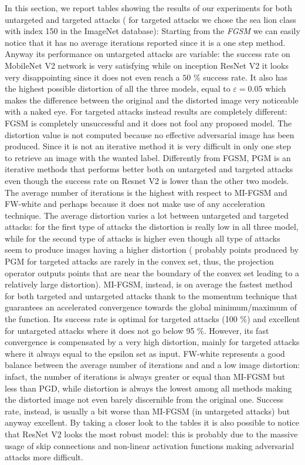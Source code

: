 \documentclass[10pt,twocolumn,letterpaper, english]{article}
\theoremstyle{definition}
\theoremstyle{plain}
\theoremstyle{plain}
\theoremstyle{plain}
\theoremstyle{plain}
\theoremstyle{remark}
\theoremstyle{remark}
\theoremstyle{definition}
\theoremstyle{definition}
\theoremstyle{definition}
\theoremstyle{definition}
\renewcommand{\epsilon}{\varepsilon}
\begin{document}
In this section, we report tables showing the results of our experiments for both untargeted and targeted attacks ( for targeted attacks we chose the sea lion class with index 150 in the ImageNet database):
Starting from the \textit{FGSM} we can easily notice that it has no average iterations reported since it is a one step method. Anyway its performance on untargeted attacks are variable: the success rate on MobileNet V2 network is very satisfying while on inception ResNet V2 it looks very disappointing since it does not even reach a $50$ \% success rate.
It also has the highest possible distortion of all the three models, equal to $\epsilon = 0.05$ which makes the difference between the original and the distorted image very noticeable with a naked eye.
For targeted attacks instead results are completely different: FGSM is completely unsuccessful and it does not fool any proposed model. The distortion value is not computed because no effective adversarial image has been produced. Since it is not an iterative method it is very difficult in only one step to retrieve an image with the wanted label.
Differently from FGSM, PGM is an iterative methods that performs better both on untargeted and targeted attacks even though the success rate on Resnet V2 is lower than the other two models. The average number of iterations is the highest with respect to MI-FGSM and FW-white and perhaps because it does not make use of any acceleration technique. The average distortion varies a lot between untargeted and targeted attacks: for the first type of attacks the distortion is really low in all three model, while for the second type of attacks is higher even though all type of attacks seem to produce images having a higher distortion ( probably points produced by PGM for targeted attacks are rarely in the convex set, thus, the projection operator outputs points that are near the boundary of the convex set leading to a relatively large distortion).
MI-FGSM, instead, is on average the fastest method for both targeted and untargeted attacks thank to the momentum technique that guarantees an  accelerated convergence towards the global minimum/maximum of the function. Its success rate is optimal for targeted attacks (100 \%) and excellent for untargeted attacks where it does not go below 95 \%. However, its fast convergence is compensated by a very high distortion, mainly for targeted attacks where it always equal to the epsilon set as input.
FW-white represents a good balance between the average number of iterations and and a low image distortion: infact, the number of iterations is always greater or equal than MI-FGSM but less than PGD, while distortion is always the lowest among all methods making the distorted image not even barely discernible from the original one. Success rate, instead, is usually a bit worse than MI-FGSM (in untargeted attacks) but anyway excellent.
By taking a closer look to the tables it is also possible to notice that ResNet V2 looks the most robust model: this is probably due to the massive usage of skip connections and non-linear activation functions making adversarial attacks more difficult.
\
\end{document}

